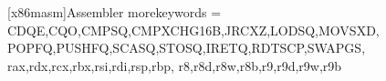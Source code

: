 [x86masm]{Assembler} %
{   %
    morekeywords = {
        CDQE,CQO,CMPSQ,CMPXCHG16B,JRCXZ,LODSQ,MOVSXD, %
        POPFQ,PUSHFQ,SCASQ,STOSQ,IRETQ,RDTSCP,SWAPGS, %
        rax,rdx,rcx,rbx,rsi,rdi,rsp,rbp, %
        r8,r8d,r8w,r8b,r9,r9d,r9w,r9b
    }
}
